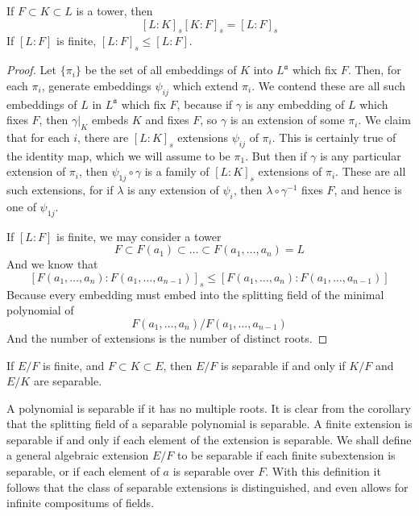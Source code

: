 \begin{theorem}
    If $F \subset K \subset L$ is a tower, then
    \[ [L:K]_s [K:F]_s = [L:F]_s \]
    If $[L:F]$ is finite, $[L:F]_s \leq [L:F]$.
\end{theorem}
\begin{proof}
    Let $\{ \pi_i \}$ be the set of all embeddings of $K$ into $L^{\mathfrak{a}}$ which fix $F$. Then, for each $\pi_i$, generate embeddings $\psi_{ij}$ which extend $\pi_i$. We contend these are all such embeddings of $L$ in $L^{\mathfrak{a}}$ which fix $F$, because if $\gamma$ is any embedding of $L$ which fixes $F$, then $\gamma|_K$ embeds $K$ and fixes $F$, so $\gamma$ is an extension of some $\pi_i$. We claim that for each $i$, there are $[L:K]_s$ extensions $\psi_{ij}$ of $\pi_i$. This is certainly true of the identity map, which we will assume to be $\pi_1$. But then if $\gamma$ is any particular extension of $\pi_i$, then $\psi_{1j} \circ \gamma$ is a family of $[L:K]_s$ extensions of $\pi_i$. These are all such extensions, for if $\lambda$ is any extension of $\psi_i$, then $\lambda \circ \gamma^{-1}$ fixes $F$, and hence is one of $\psi_{1j}$.

    If $[L:F]$ is finite, we may consider a tower
    \[ F \subset F(a_1) \subset \dots \subset F(a_1, \dots, a_n) = L \]
    And we know that
    \[ [F(a_1, \dots, a_n): F(a_1, \dots, a_{n-1})]_s \leq [F(a_1, \dots, a_n): F(a_1, \dots, a_{n-1})] \]
    Because every embedding must embed into the splitting field of the minimal polynomial of
    \[ F(a_1, \dots, a_n)/F(a_1, \dots, a_{n-1}) \]
    And the number of extensions is the number of distinct roots.
\end{proof}

\begin{corollary}
    If $E/F$ is finite, and $F \subset K \subset E$, then $E/F$ is separable if and only if $K/F$ and $E/K$ are separable.
\end{corollary}

A polynomial is separable if it has no multiple roots. It is clear from the corollary that the splitting field of a separable polynomial is separable. A finite extension is separable if and only if each element of the extension is separable. We shall define a general algebraic extension $E/F$ to be separable if each finite subextension is separable, or if each element of $a$ is separable over $F$. With this definition it follows that the class of separable extensions is distinguished, and even allows for infinite compositums of fields.

